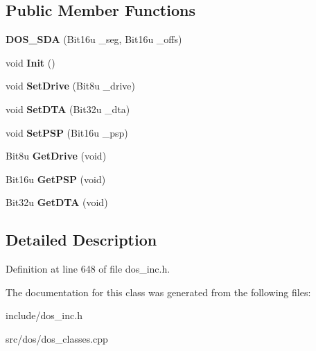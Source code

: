 \subsection*{Public Member Functions}
\begin{DoxyCompactItemize}
\item 
\hypertarget{classDOS__SDA_a6d3cdb7092bcf54e478ccf3f47ba5d5f}{{\bfseries D\-O\-S\-\_\-\-S\-D\-A} (Bit16u \-\_\-seg, Bit16u \-\_\-offs)}\label{classDOS__SDA_a6d3cdb7092bcf54e478ccf3f47ba5d5f}

\item 
\hypertarget{classDOS__SDA_ac7714f909bc845b995adc9d83a336dc7}{void {\bfseries Init} ()}\label{classDOS__SDA_ac7714f909bc845b995adc9d83a336dc7}

\item 
\hypertarget{classDOS__SDA_a26e7bcf4f9d9624cb400868ba2c92042}{void {\bfseries Set\-Drive} (Bit8u \-\_\-drive)}\label{classDOS__SDA_a26e7bcf4f9d9624cb400868ba2c92042}

\item 
\hypertarget{classDOS__SDA_a97cc9bf22c2fd0b3dfcdf9e7ed941b90}{void {\bfseries Set\-D\-T\-A} (Bit32u \-\_\-dta)}\label{classDOS__SDA_a97cc9bf22c2fd0b3dfcdf9e7ed941b90}

\item 
\hypertarget{classDOS__SDA_a01a00b99627b18c1b53112911554fb40}{void {\bfseries Set\-P\-S\-P} (Bit16u \-\_\-psp)}\label{classDOS__SDA_a01a00b99627b18c1b53112911554fb40}

\item 
\hypertarget{classDOS__SDA_a6191cfbb11aa6071c6900e3a42d3d4e8}{Bit8u {\bfseries Get\-Drive} (void)}\label{classDOS__SDA_a6191cfbb11aa6071c6900e3a42d3d4e8}

\item 
\hypertarget{classDOS__SDA_a7a777fd33ac1dcf09aeaa1e94e53eec5}{Bit16u {\bfseries Get\-P\-S\-P} (void)}\label{classDOS__SDA_a7a777fd33ac1dcf09aeaa1e94e53eec5}

\item 
\hypertarget{classDOS__SDA_a4a0b598523ac18da40e069ff37f43fe4}{Bit32u {\bfseries Get\-D\-T\-A} (void)}\label{classDOS__SDA_a4a0b598523ac18da40e069ff37f43fe4}

\end{DoxyCompactItemize}


\subsection{Detailed Description}


Definition at line 648 of file dos\-\_\-inc.\-h.



The documentation for this class was generated from the following files\-:\begin{DoxyCompactItemize}
\item 
include/dos\-\_\-inc.\-h\item 
src/dos/dos\-\_\-classes.\-cpp\end{DoxyCompactItemize}
